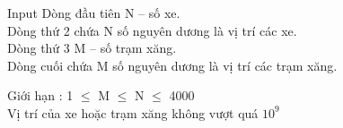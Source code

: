 Input
Dòng đầu tiên N – số xe.   
\\   Dòng thứ 2 chứa N số nguyên dương là vị trí các xe.   
\\   Dòng thứ 3 M – số trạm xăng.   
\\   Dòng cuối chứa M số nguyên dương là vị trí các trạm xăng.  

    Giới hạn :      1 $\le$  M  $\le$  N  $\le$  4000   
\\   Vị trí của xe hoặc trạm xăng không vượt quá $10^{9}$